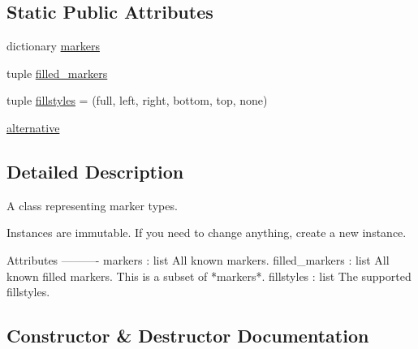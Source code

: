 \subsection*{Static Public Attributes}
\begin{DoxyCompactItemize}
\item 
dictionary \hyperlink{classmatplotlib_1_1markers_1_1MarkerStyle_a0ddfb9c88144670b3551f8b36c07fab1}{markers}
\item 
tuple \hyperlink{classmatplotlib_1_1markers_1_1MarkerStyle_ae4301cbc41c4afe3bf1437326e06688b}{filled\+\_\+markers}
\item 
tuple \hyperlink{classmatplotlib_1_1markers_1_1MarkerStyle_afdd2d6b5d2416a69e548989c2b518da4}{fillstyles} = (\textquotesingle{}full\textquotesingle{}, \textquotesingle{}left\textquotesingle{}, \textquotesingle{}right\textquotesingle{}, \textquotesingle{}bottom\textquotesingle{}, \textquotesingle{}top\textquotesingle{}, \textquotesingle{}none\textquotesingle{})
\item 
\hyperlink{classmatplotlib_1_1markers_1_1MarkerStyle_a4b1fa06637fd0b54bfcb0aa83bfefac8}{alternative}
\end{DoxyCompactItemize}


\subsection{Detailed Description}
\begin{DoxyVerb}A class representing marker types.

Instances are immutable. If you need to change anything, create a new
instance.

Attributes
----------
markers : list
    All known markers.
filled_markers : list
    All known filled markers. This is a subset of *markers*.
fillstyles : list
    The supported fillstyles.
\end{DoxyVerb}
 

\subsection{Constructor \& Destructor Documentation}
\mbox{\label{classmatplotlib_1_1markers_1_1MarkerStyle_aaea0f158b1732aa8c5fa647e5e580b64}} 
